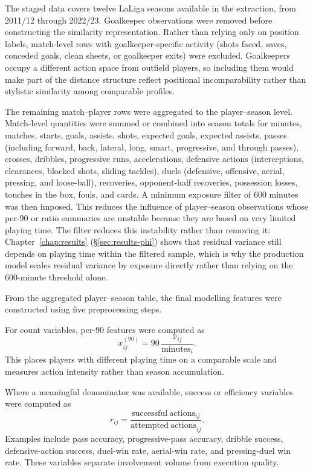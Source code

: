 The staged data covers twelve LaLiga seasons available in the extraction, from 2011/12 through 2022/23. Goalkeeper observations were removed before constructing the similarity representation. Rather than relying only on position labels, match-level rows with goalkeeper-specific activity (shots faced, saves, conceded goals, clean sheets, or goalkeeper exits) were excluded. Goalkeepers occupy a different action space from outfield players, so including them would make part of the distance structure reflect positional incomparability rather than stylistic similarity among comparable profiles.

The remaining match--player rows were aggregated to the player--season level. Match-level quantities were summed or combined into season totals for minutes, matches, starts, goals, assists, shots, expected goals, expected assists, passes (including forward, back, lateral, long, smart, progressive, and through passes), crosses, dribbles, progressive runs, accelerations, defensive actions (interceptions, clearances, blocked shots, sliding tackles), duels (defensive, offensive, aerial, pressing, and loose-ball), recoveries, opponent-half recoveries, possession losses, touches in the box, fouls, and cards. A minimum exposure filter of 600 minutes was then imposed. This reduces the influence of player--season observations whose per-90 or ratio summaries are unstable because they are based on very limited playing time. The filter reduces this instability rather than removing it: Chapter~\ref{chap:results} (\S\ref{sec:results-phi}) shows that residual variance still depends on playing time within the filtered sample, which is why the production model scales residual variance by exposure directly rather than relying on the 600-minute threshold alone.

From the aggregated player--season table, the final modelling features were constructed using five preprocessing steps.

\begin{definition}
For count variables, per-90 features were computed as
\[
x^{(90)}_{ij}=90\,\frac{x_{ij}}{\mathrm{minutes}_i}.
\]
This places players with different playing time on a comparable scale and measures action intensity rather than season accumulation.
\end{definition}

\begin{definition}
Where a meaningful denominator was available, success or efficiency variables were computed as
\[
r_{ij}=\frac{\mathrm{successful\ actions}_{ij}}{\mathrm{attempted\ actions}_{ij}}.
\]
Examples include pass accuracy, progressive-pass accuracy, dribble success, defensive-action success, duel-win rate, aerial-win rate, and pressing-duel win rate. These variables separate involvement volume from execution quality.
\end{definition}

